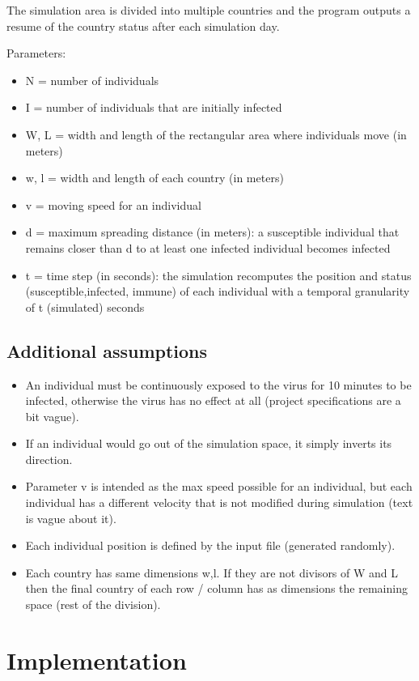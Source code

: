 \documentclass[10pt]{article}
\begin{document}
	The simulation area is divided into multiple countries and the program outputs a resume of the country status after each simulation day.
	
	Parameters:
	\begin{itemize}
		\item N = number of individuals
		\item I = number of individuals that are initially infected
		\item W, L = width and length of the rectangular area where individuals move (in meters)
		\item w, l = width and length of each country (in meters)
		\item v = moving speed for an individual
		\item d = maximum spreading distance (in meters): a susceptible individual that remains closer than d to at least one infected individual becomes infected
		\item t = time step (in seconds): the simulation recomputes the position and status (susceptible,infected, immune) of each individual with a temporal granularity of t (simulated) seconds
	\end{itemize}

	\subsection{Additional assumptions} \label{assumptions}
	\begin{itemize}
		\item An individual must be continuously exposed to the virus for 10 minutes to be infected, otherwise the virus has no effect at all (project specifications are a bit vague).
		\item If an individual would go out of the simulation space, it simply inverts its direction.
		\item Parameter v is intended as the max speed possible for an individual, but each individual has a different velocity that is not modified during simulation (text is vague about it).
		\item Each individual position is defined by the input file (generated randomly).
		\item Each country has same dimensions w,l. If they are not divisors of W and L then the final country of each row / column has as dimensions the remaining space (rest of the division). 
	\end{itemize}
	
	\section{Implementation}
\end{document}
